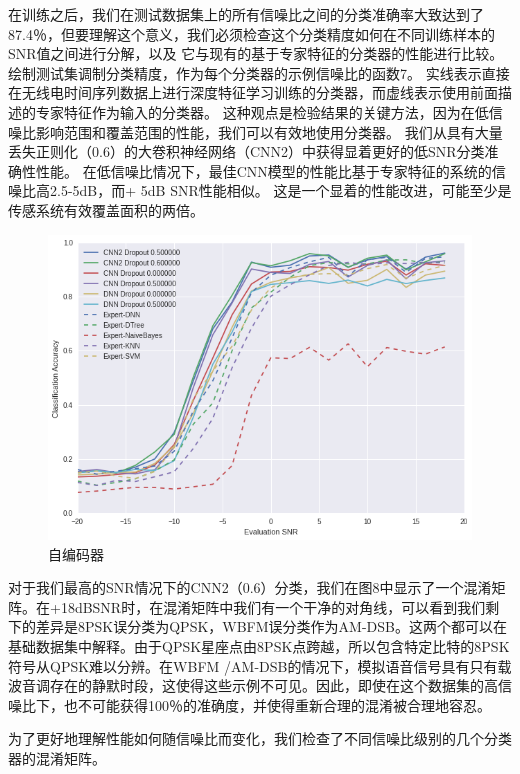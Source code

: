 在训练之后，我们在测试数据集上的所有信噪比之间的分类准确率大致达到了87.4％，但要理解这个意义，我们必须检查这个分类精度如何在不同训练样本的SNR值之间进行分解，以及 它与现有的基于专家特征的分类器的性能进行比较。绘制测试集调制分类精度，作为每个分类器的示例信噪比的函数7。 实线表示直接在无线电时间序列数据上进行深度特征学习训练的分类器，而虚线表示使用前面描述的专家特征作为输入的分类器。 这种观点是检验结果的关键方法，因为在低信噪比影响范围和覆盖范围的性能，我们可以有效地使用分类器。 我们从具有大量丢失正则化（0.6）的大卷积神经网络（CNN2）中获得显着更好的低SNR分类准确性性能。 在低信噪比情况下，最佳CNN模型的性能比基于专家特征的系统的信噪比高2.5-5dB，而+ 5dB SNR性能相似。 这是一个显着的性能改进，可能至少是传感系统有效覆盖面积的两倍。\par
\begin{figure}[!h]
	\centering
	\includegraphics[scale=0.3]{figures/chapter_3/result}
	\caption{自编码器}	\label{fig_3_2}
\end{figure}
对于我们最高的SNR情况下的CNN2（0.6）分类，我们在图8中显示了一个混淆矩阵。在+18dBSNR时，在混淆矩阵中我们有一个干净的对角线，可以看到我们剩下的差异是8PSK误分类为QPSK，WBFM误分类作为AM-DSB。这两个都可以在基础数据集中解释。由于QPSK星座点由8PSK点跨越，所以包含特定比特的8PSK符号从QPSK难以分辨。在WBFM /AM-DSB的情况下，模拟语音信号具有只有载波音调存在的静默时段，这使得这些示例不可见。因此，即使在这个数据集的高信噪比下，也不可能获得100％的准确度，并使得重新合理的混淆被合理地容忍。\par

为了更好地理解性能如何随信噪比而变化，我们检查了不同信噪比级别的几个分类器的混淆矩阵。\par

